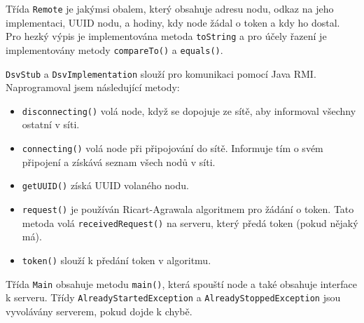 \documentclass[11pt]{scrartcl}
\begin{document}
    Třída \texttt{Remote} je jakýmsi obalem, který obsahuje adresu nodu, odkaz na jeho implementaci, UUID nodu, a
    hodiny, kdy node žádal o token a kdy ho dostal. Pro hezký výpis je implementována metoda \texttt{toString} a pro
    účely řazení je implementovány metody \texttt{compareTo()} a \texttt{equals()}.

    \texttt{DsvStub} a \texttt{DsvImplementation} slouží pro komunikaci pomocí Java RMI. Naprogramoval jsem
    následující metody:

    \begin{itemize}
        \item \texttt{disconnecting()} volá node, když se dopojuje ze sítě, aby informoval všechny ostatní v síti.
        \item \texttt{connecting()} volá node při připojování do sítě. Informuje tím o svém připojení a získává
        seznam všech nodů v síti.
        \item \texttt{getUUID()} získá UUID volaného nodu.
        \item \texttt{request()} je používán Ricart-Agrawala algoritmem pro žádání o token. Tato metoda volá
        \texttt{receivedRequest()} na serveru, který předá token (pokud nějaký má).
        \item \texttt{token()} slouží k předání token v algoritmu.
    \end{itemize}

    Třída \texttt{Main} obsahuje metodu \texttt{main()}, která spouští node a také obsahuje interface k serveru.
    Třídy \texttt{AlreadyStartedException} a \texttt{AlreadyStoppedException} jsou vyvolávány serverem, pokud dojde k
    chybě.
\end{document}
